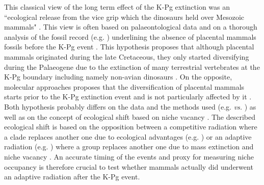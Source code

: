 \documentclass[12pt,letterpaper]{article}
\begin{document}
This classical view of the long term effect of the K-Pg extinction was an ``ecological release from the vice grip which the dinosaurs held over Mesozoic mammals" \cite{Lovergrove}. This view is often based on palaeontological data and on a thorough analysis of the fossil record (e.g. \cite{goswamia2011,O'Leary08022013}) underlining the absence of placental mammals fossils before the K-Pg event \cite{archibald2011extinction,goswamia2011,Slater2012MEE,O'Leary08022013,Wilson2013,Brusatte2015}. This hypothesis proposes that although placental mammals originated during the late Cretaceous, they only started diversifying during the Palaeogene due to the extinction of many terrestrial vertebrates at the K-Pg boundary including namely non-avian dinosaurs \cite{archibald2011extinction,O'Leary08022013,Brusatte2015}. On the opposite, molecular approaches proposes that the diversification of placental mammals starts prior to the K-Pg extinction event and is not particularly affected by it \cite{bininda2007delayed,meredithimpacts2011,Stadler12042011,beckancient2014}. Both hypothesis probably differs on the data and the methods used (e.g. \cite{meredithimpacts2011} \textit{vs.} \cite{O'Leary08022013}) as well as on the concept of ecological shift based on niche vacancy \cite{Pearman2008149,slaterCetacean,hopkinsdecoupling2013}. The described ecological shift is based on the opposition between a competitive radiation where a clade replaces another one due to ecological advantages (e.g. \cite{Brusatte12092008}) or an adaptive radiation (e.g. \cite{O'Leary08022013}) where a group replaces another one due to mass extinction and niche vacancy \cite{Pearman2008149,slaterCetacean,hopkinsdecoupling2013}. An accurate timing of the events and proxy for measuring niche occupancy is therefore crucial to test whether mammals actually did underwent an adaptive radiation after the K-Pg event.
\end{document}
